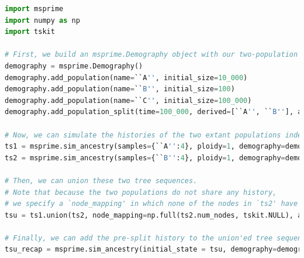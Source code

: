 \begin{lstlisting}[language=Python, caption={Python code to union two independently simulated populations using \msprime and \tskit.}, label=code:union, breaklines=true]
import msprime
import numpy as np
import tskit

# First, we build an msprime.Demography object with our two-population history that splits 100,000 units of time ago
demography = msprime.Demography()
demography.add_population(name=``A'', initial_size=10_000)
demography.add_population(name=``B'', initial_size=100)
demography.add_population(name=``C'', initial_size=100_000)
demography.add_population_split(time=100_000, derived=[``A'', ``B''], ancestral=``C'')

# Now, we can simulate the histories of the two extant populations independently
ts1 = msprime.sim_ancestry(samples={``A'':4}, ploidy=1, demography=demography, sequence_length=50, recombination_rate=1e-6, random_seed=123)
ts2 = msprime.sim_ancestry(samples={``B'':4}, ploidy=1, demography=demography, sequence_length=50, recombination_rate=1e-6, random_seed=1)

# Then, we can union these two tree sequences.
# Note that because the two populations do not share any history,
# we specify a `node_mapping' in which none of the nodes in `ts2' have an equivalent in `ts1'.
tsu = ts1.union(ts2, node_mapping=np.full(ts2.num_nodes, tskit.NULL), add_populations=False)

# Finally, we can add the pre-split history to the union'ed tree sequence with msprime.sim_ancestry.
tsu_recap = msprime.sim_ancestry(initial_state = tsu, demography=demography, random_seed=3)
\end{lstlisting}

